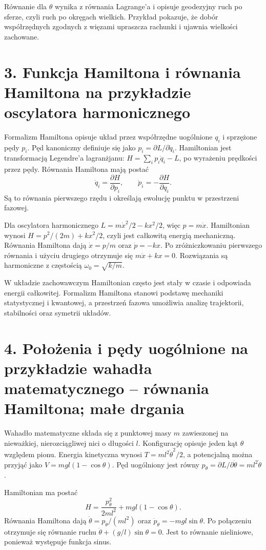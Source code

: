 \documentclass[11pt,a4paper,oneside]{report}
\begin{document}
Równanie dla \(\theta\) wynika z równania Lagrange’a i opisuje geodezyjny ruch po sferze, czyli ruch po okręgach wielkich. Przykład pokazuje, że dobór współrzędnych zgodnych z więzami upraszcza rachunki i ujawnia wielkości zachowane.

\section{3. Funkcja Hamiltona i równania Hamiltona na przykładzie oscylatora harmonicznego}
Formalizm Hamiltona opisuje układ przez współrzędne uogólnione \(q_i\) i sprzężone pędy \(p_i\). Pęd kanoniczny definiuje się jako \(p_i=\partial L/\partial\dot q_i\). Hamiltonian jest transformacją Legendre’a lagranżjanu: \(H=\sum_i p_i\dot q_i-L\), po wyrażeniu prędkości przez pędy. Równania Hamiltona mają postać
\[
\dot q_i=\frac{\partial H}{\partial p_i},\qquad
\dot p_i=-\frac{\partial H}{\partial q_i}.
\]
Są to równania pierwszego rzędu i określają ewolucję punktu w przestrzeni fazowej.

Dla oscylatora harmonicznego \(L=m\dot x^2/2-kx^2/2\), więc \(p=m\dot x\). Hamiltonian wynosi \(H=p^2/(2m)+kx^2/2\), czyli jest całkowitą energią mechaniczną. Równania Hamiltona dają \(\dot x=p/m\) oraz \(\dot p=-kx\). Po zróżniczkowaniu pierwszego równania i użyciu drugiego otrzymuje się \(m\ddot x+kx=0\). Rozwiązania są harmoniczne z częstością \(\omega_0=\sqrt{k/m}\).

W układzie zachowawczym Hamiltonian często jest stały w czasie i odpowiada energii całkowitej. Formalizm Hamiltona stanowi podstawę mechaniki statystycznej i kwantowej, a przestrzeń fazowa umożliwia analizę trajektorii, stabilności oraz symetrii układów.

\section{4. Położenia i pędy uogólnione na przykładzie wahadła matematycznego – równania Hamiltona; małe drgania}
Wahadło matematyczne składa się z punktowej masy \(m\) zawieszonej na nieważkiej, nierozciągliwej nici o długości \(l\). Konfigurację opisuje jeden kąt \(\theta\) względem pionu. Energia kinetyczna wynosi \(T=ml^2\dot\theta^2/2\), a potencjalną można przyjąć jako \(V=mgl(1-\cos\theta)\). Pęd uogólniony jest równy \(p_\theta=\partial L/\partial\dot\theta=ml^2\dot\theta\).

Hamiltonian ma postać
\[
H=\frac{p_\theta^2}{2ml^2}+mgl(1-\cos\theta).
\]
Równania Hamiltona dają \(\dot\theta=p_\theta/(ml^2)\) oraz \(\dot p_\theta=-mgl\sin\theta\). Po połączeniu otrzymuje się równanie ruchu \(\ddot\theta+(g/l)\sin\theta=0\). Jest to równanie nieliniowe, ponieważ występuje funkcja sinus.
\end{document}
